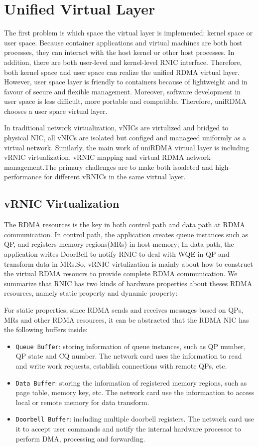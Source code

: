 
\section{Unified Virtual Layer}
The first problem is which space the virtual layer is implemented: kernel space or user space. Because container applications and virtual machines are both host processes, they can interact with the host kernel or other host processes. In addition, there are both user-level and kernel-level RNIC interface. Therefore, both kernel space and user space can realize the unified RDMA virtual layer. However, user space layer is friendly to containers because of lightweight and in favour of secure and flexible management. Moreover, software development in user space is less difficult, more portable and compatible. Therefore, uniRDMA chooses a user space virtual layer.

In traditional network virtualization, vNICs are virtulized and bridged to physical NIC, all vNICs are isolated but configed and manageed uniformly as a virtual network. Similarly, the main work of uniRDMA virtual layer is including vRNIC virtualization, vRNIC mapping  and virtual RDMA network management.The primary challenges are to make both isoaleted and high-performance for different vRNICs in the same virtual layer. 
	
\subsection{vRNIC Virtualization}
The RDMA resources is the key in both control path and data path at RDMA communication. In control path, the application creates queue instances such as QP, and registers memory regions(MRs) in host memory; In data path, the application writes DoorBell to notify RNIC to deal with WQE in QP and transform data in MRs.So, vRNIC virtulization is mainly about how to construct the virtual RDMA resoucrs to provide complete RDMA communication. We summarize that RNIC has two kinds of hardware properties about theses RDMA resources, namely static property and dynamic property:

For static properties,  since RDMA sends and receives messages based on QPs, MRs and other RDMA resources, it can be abstracted that the RDMA NIC has the following buffers inside:

\begin{itemize}
\item {\verb|Queue Buffer|}: storing information of queue instances, such as QP number, QP state and CQ number. The network card uses the information to read and write work requests, establish connections with remote QPs, etc.  
\item {\verb|Data Buffer|}: storing the information of registered memory regions, such as page table, memory key, etc. The network card use the informaation to access local or remote memory for data transform.  
\item {\verb|Doorbell Buffer|}: including multiple doorbell registers. The network card use it to accept user commands and notify the internal hardware processor to perform DMA, processing and forwarding. 
\end{itemize}


